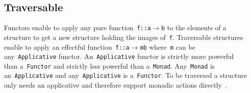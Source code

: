 \documentclass[9pt,authoryear]{sigplanconf}
\begin{document}
\subsection{Traversable}

%
Functors enable to apply any pure function{~}\texttt{f}\texttt{\mbox{\hspace{0.50em}}}\texttt{{:}{:}}\texttt{\mbox{\hspace{0.50em}}}\texttt{a}\texttt{\mbox{\hspace{0.50em}}}\texttt{$ \rightarrow $}\texttt{\mbox{\hspace{0.50em}}}\texttt{b} to the
    elements of a structure to get a new structure holding the images
    of{~}\texttt{f}. Traversable structures enable to apply an effectful
    function{~}\texttt{f}\texttt{\mbox{\hspace{0.50em}}}\texttt{{:}{:}}\texttt{\mbox{\hspace{0.50em}}}\texttt{a}\texttt{\mbox{\hspace{0.50em}}}\texttt{$ \rightarrow $}\texttt{\mbox{\hspace{0.50em}}}\texttt{m}\texttt{\mbox{\hspace{0.50em}}}\texttt{b} where{~}\texttt{m} can be any{~}\texttt{Applicative}    functor. An{~}\texttt{Applicative} functor is strictly more powerful
    than a{~}\texttt{Functor} and strictly less powerful than a{~}\texttt{Monad}.
    Any{~}\texttt{Monad} is an{~}\texttt{Applicative} and any{~}\texttt{Applicative}    is a{~}\texttt{Functor}. To be traversed a structure only needs
    an applicative and therefore support monadic actions
    directly{~}\cite{mcbride_applicative_2007}.%


{\nopagebreak }
\end{document}
